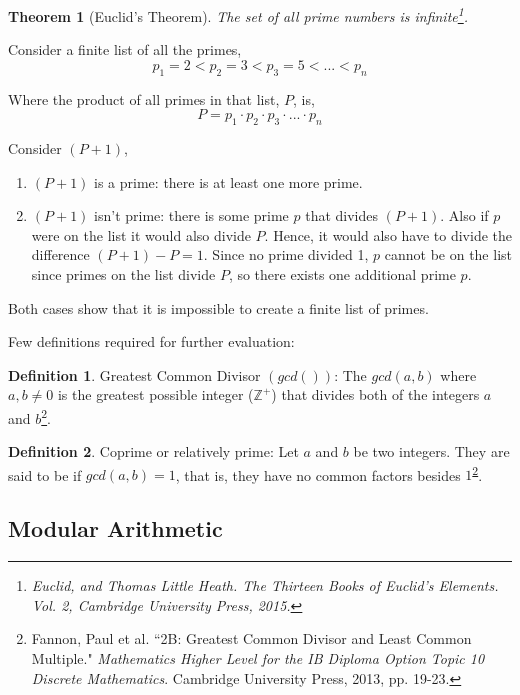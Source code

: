 \documentclass[a4paper,12pt]{article}
\newtheorem{theorem}{Theorem}
\theoremstyle{definition}
\newtheorem{definition}{Definition}
\begin{document}
\begin{theorem}[Euclid's Theorem]
    The set of all prime numbers is infinite\footnote{Euclid, and Thomas Little Heath. \textit{The Thirteen Books of Euclid's Elements.} Vol. 2, Cambridge University Press, 2015.}.
\end{theorem}
Consider a finite list of all the primes,
\begin{equation*}
    p_1=2<p_2=3<p_3=5<...<p_n
\end{equation*}

Where the product of all primes in that list, $P$, is,
\begin{equation*}
    P= p_1 \cdot p_2 \cdot p_3 \cdot ... \cdot p_n
\end{equation*}

Consider $(P+1)$, 
\begin{enumerate}
	\item $(P+1)$ is a prime:  there is at least one more prime.
	\item $(P+1)$ isn't prime: there is some prime $p$ that divides $(P+1)$. Also if $p$ were on the list it would also divide $P$. Hence, it would also have to divide the difference $(P+1) - P = 1$. Since no prime divided 1, $p$ cannot  be on the list since primes on the list divide $P$, so there exists one additional prime $p$.
\end{enumerate}

Both cases show that it is impossible to create a finite list of primes.

Few definitions required for further evaluation:
\theoremstyle{definition}
\begin{definition}{Greatest Common Divisor $(gcd())$:}
	The $gcd(a,b)$ where $a,b \neq 0$ is the greatest possible integer ($\mathbb{Z^+}$) that divides both of the integers $a$ and $b$\footnote{\label{chapter2B}Fannon, Paul et al. ``2B: Greatest Common Divisor and Least Common Multiple." \textit{Mathematics Higher Level for the IB Diploma Option Topic 10 Discrete Mathematics}. Cambridge University Press, 2013, pp. 19-23.}.
\end{definition}
\theoremstyle{definition}
\begin{definition}{Coprime or relatively prime:}
	Let $a$ and $b$ be two integers. They are said to be if $gcd(a,b)=1$, that is, they have no common factors besides $1$\textsuperscript{\ref{chapter2B}}.
\end{definition}


\subsection{Modular Arithmetic}
\end{document}
